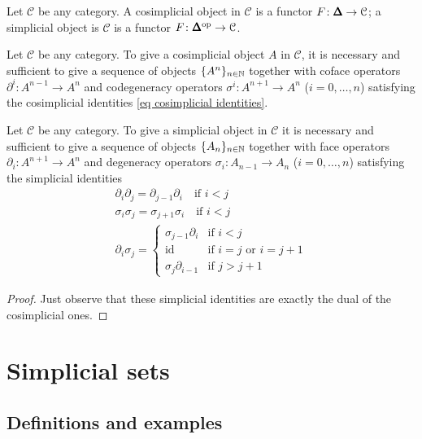 \begin{refsection}
\begin{defin} \label{def (co)simplicial objects}
Let $\mathcal C$ be any category. A cosimplicial object in $\mathcal C$ is a functor $F \colon \pmb{\Delta} \to \mathcal C$; a simplicial object is $\mathcal C$ is a functor $F \colon \pmb{\Delta}^\text{op} \to \mathcal C$.
\end{defin}

\begin{cor}
Let $\mathcal C$ be any category. To give a cosimplicial object $A$ in $\mathcal C$, it is necessary and sufficient to give a sequence of objects $\{A^n\}_{n \in \mathbb{N}}$ together with coface operators $\partial^i \colon A^{n-1} \to A^n$ and codegeneracy operators $\sigma^i \colon A^{n+1} \to A^n$ ($i = 0,\ldots,n$) satisfying the cosimplicial identities \eqref{eq cosimplicial identities}.
\end{cor}

\begin{cor}
Let $\mathcal C$ be any category. To give a simplicial object in $\mathcal C$ it is necessary and sufficient to give a sequence of objects $\{A_n\}_{n \in \mathbb{N}}$ together with face operators $\partial_i \colon A^{n+1} \to A^n$ and degeneracy operators $\sigma_i \colon A_{n-1} \to A_n$ ($i = 0, \ldots, n$) satisfying the simplicial identities
\begin{gather*}
\partial_i \partial_j = \partial_{j-1} \partial_i \quad \text{if } i < j \\
\sigma_i \sigma_j = \sigma_{j+1} \sigma_i \quad \text{if } i < j \\
\partial_i \sigma_j = \begin{cases} \sigma_{j-1} \partial_i & \text{if } i < j \\
\mathrm{id} & \text{if } i = j \text{ or } i = j+1 \\ \sigma_j \partial_{i-1} & \text{if } j > j+1 \end{cases}
\end{gather*}
\end{cor}

\begin{proof}
Just observe that these simplicial identities are exactly the dual of the cosimplicial ones.
\end{proof}

\section{Simplicial sets}

\subsection{Definitions and examples}


\end{refsection}
